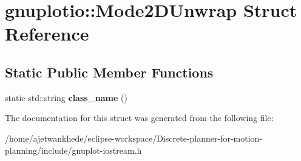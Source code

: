 \hypertarget{structgnuplotio_1_1Mode2DUnwrap}{}\section{gnuplotio\+:\+:Mode2\+D\+Unwrap Struct Reference}
\label{structgnuplotio_1_1Mode2DUnwrap}
\subsection*{Static Public Member Functions}
\begin{DoxyCompactItemize}
\item 
\mbox{\label{structgnuplotio_1_1Mode2DUnwrap_ab2f533c9ceb52cfecaa161c64316deb9}} 
static std\+::string {\bfseries class\+\_\+name} ()
\end{DoxyCompactItemize}


The documentation for this struct was generated from the following file\+:\begin{DoxyCompactItemize}
\item 
/home/ajetwankhede/eclipse-\/workspace/\+Discrete-\/planner-\/for-\/motion-\/planning/include/gnuplot-\/iostream.\+h\end{DoxyCompactItemize}
